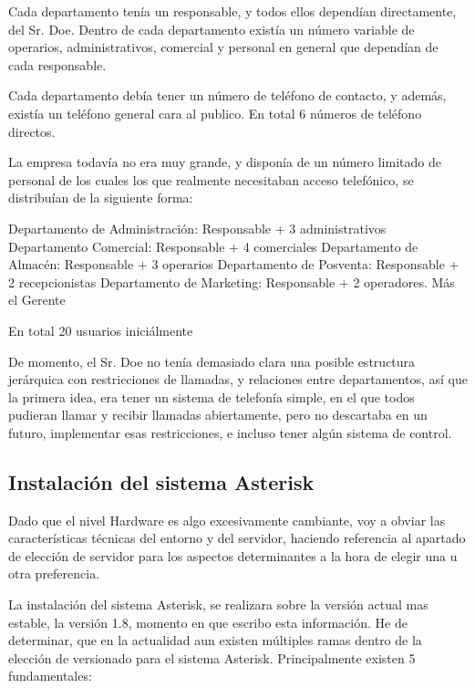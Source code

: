 Cada departamento tenía un responsable, y todos ellos dependían directamente, del Sr. Doe. Dentro de cada departamento existía un número variable de operarios, administrativos, comercial y personal en general que dependían de cada responsable.

Cada departamento debía tener un número de teléfono de contacto, y además, existía un teléfono general cara al publico. En total 6 números de teléfono directos.

La empresa todavía no era muy grande, y disponía de un número limitado de personal de los cuales los que realmente necesitaban acceso telefónico, se distribuían de la siguiente forma:

Departamento de Administración: Responsable + 3 administrativos
Departamento Comercial: Responsable + 4 comerciales
Departamento de Almacén: Responsable + 3 operarios
Departamento de Posventa: Responsable + 2 recepcionistas
Departamento de Marketing: Responsable + 2 operadores.
Más el Gerente

En total 20 usuarios iniciálmente

De momento, el Sr. Doe no tenía demasiado clara una posible estructura jerárquica con restricciones de llamadas, y relaciones entre departamentos, así que la primera idea, era tener un sistema de telefonía simple, en el que todos pudieran llamar y recibir llamadas abiertamente, pero no descartaba en un futuro, implementar esas restricciones, e incluso tener algún sistema de control.

\newpage

\color[rgb]{0,0,0}

\subsection{Instalación del sistema Asterisk}

Dado que el nivel Hardware es algo excesivamente cambiante, voy a obviar las características técnicas del entorno y del servidor, haciendo referencia al apartado de elección de servidor para los aspectos determinantes a la hora de elegir una u otra preferencia.

La instalación del sistema Asterisk, se realizara sobre la versión actual mas estable, la versión 1.8, momento en que escribo esta información. He de determinar, que en la actualidad aun existen múltiples ramas dentro de la elección de versionado para el sistema Asterisk. Principalmente existen 5 fundamentales:

